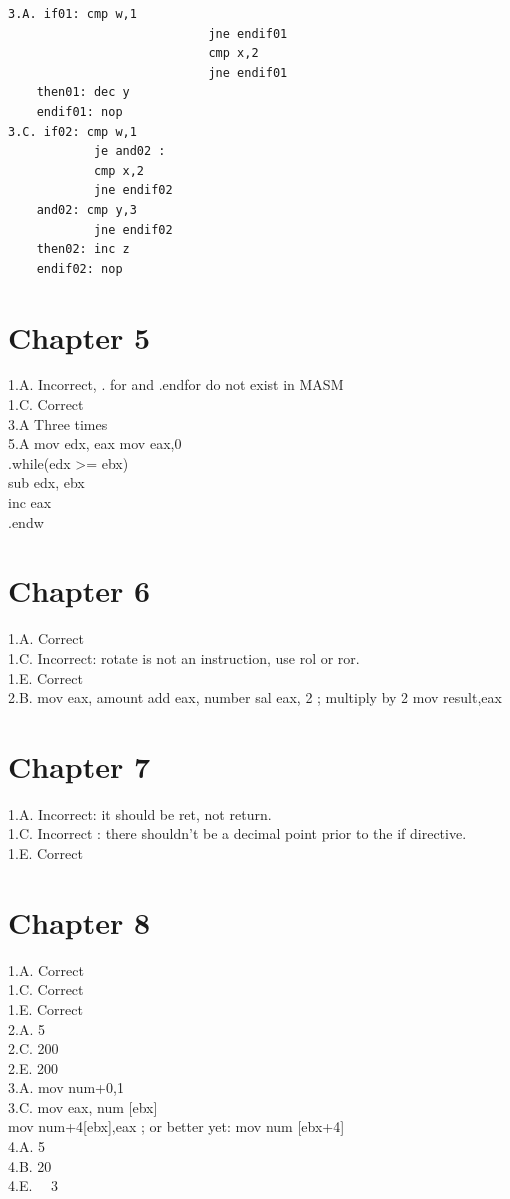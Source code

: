 \documentclass[10pt]{book}
\begin{document}
\begin{center}
\begin{center}
\begin{center}
\begin{center}
\begin{center}
\begin{verbatim}
3.A. if01: cmp w,1
                            jne endif01
                            cmp x,2
                            jne endif01
    then01: dec y
    endif01: nop
3.C. if02: cmp w,1
            je and02 :
            cmp x,2
            jne endif02
    and02: cmp y,3
            jne endif02
    then02: inc z
    endif02: nop
\end{verbatim}

\section*{Chapter 5}
1.A. Incorrect, . for and .endfor do not exist in MASM\\
1.C. Correct\\
3.A Three times\\
5.A mov edx, eax mov eax,0\\
.while(edx >= ebx)\\
sub edx, ebx\\
inc eax\\
.endw

\section*{Chapter 6}
1.A. Correct\\
1.C. Incorrect: rotate is not an instruction, use rol or ror.\\
1.E. Correct\\
2.B. mov eax, amount add eax, number sal eax, 2 ; multiply by 2 mov result,eax

\section*{Chapter 7}
1.A. Incorrect: it should be ret, not return.\\

1.C. Incorrect : there shouldn't be a decimal point prior to the if directive.\\
1.E. Correct

\section*{Chapter 8}
1.A. Correct\\
1.C. Correct\\
1.E. Correct\\
2.A. 5\\
2.C. 200\\
2.E. 200\\
3.A. mov num+0,1\\[0pt]
3.C. mov eax, num [ebx]\\[0pt]
mov num+4[ebx],eax ; or better yet: mov num [ebx+4]\\
4.A. 5\\
4.B. 20\\
4.E. $\quad 3$


\end{center}
\end{center}
\end{center}
\end{center}
\end{center}
\end{document}
